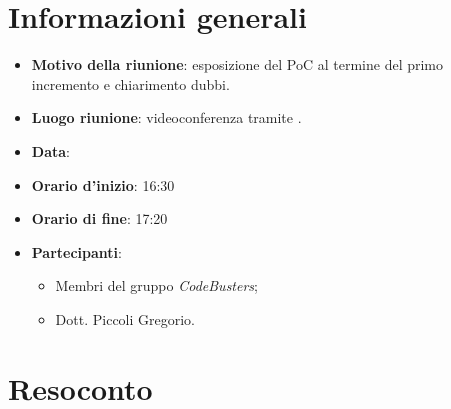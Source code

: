 \section{Informazioni generali}
\begin{itemize}
\item \textbf{Motivo della riunione}: esposizione del PoC al termine del primo incremento e chiarimento dubbi.
\item \textbf{Luogo riunione}: videoconferenza tramite .
\item \textbf{Data}: \Data{}
\item \textbf{Orario d'inizio}: 16:30 
\item \textbf{Orario di fine}: 17:20 
\item \textbf{Partecipanti}:
	\begin{itemize}
	\item Membri del gruppo \textit{CodeBusters};
	\item Dott. Piccoli Gregorio.
	\end{itemize}
\end{itemize}

\section{Resoconto}

